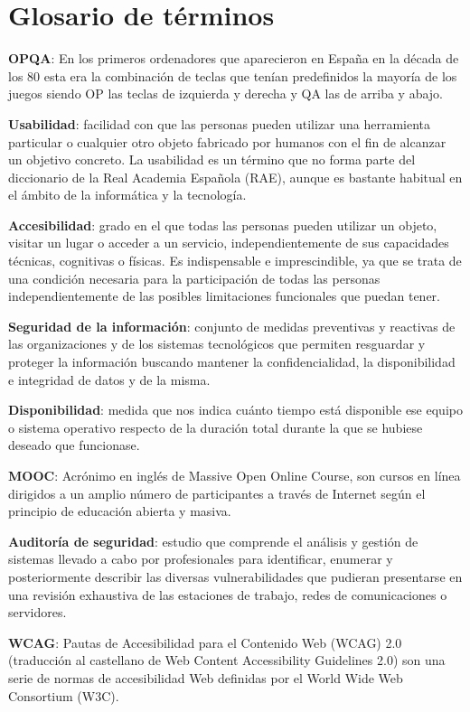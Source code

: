 \chapter{Glosario de términos}


\textbf{OPQA}: En los primeros ordenadores que aparecieron en España en la década de los 80 esta era la combinación de teclas que tenían predefinidos la mayoría de los juegos siendo OP las teclas de izquierda y derecha y QA las de arriba y abajo.
\bigskip

\textbf{Usabilidad}: facilidad con que las personas pueden utilizar una herramienta particular o cualquier otro objeto fabricado por humanos con el fin de alcanzar un objetivo concreto. La usabilidad es un término que no forma parte del diccionario de la Real Academia Española (RAE), aunque es bastante habitual en el ámbito de la informática y la tecnología.
\bigskip

\textbf{Accesibilidad}: grado en el que todas las personas pueden utilizar un objeto, visitar un lugar o acceder a un servicio, independientemente de sus capacidades técnicas, cognitivas o físicas. Es indispensable e imprescindible, ya que se trata de una condición necesaria para la participación de todas las personas independientemente de las posibles limitaciones funcionales que puedan tener.
\bigskip

\textbf{Seguridad de la información}: conjunto de medidas preventivas y reactivas de las organizaciones y de los sistemas tecnológicos que permiten resguardar y proteger la información buscando mantener la confidencialidad, la disponibilidad e integridad de datos y de la misma.
\bigskip

\textbf{Disponibilidad}: medida que nos indica cuánto tiempo está disponible ese equipo o sistema operativo respecto de la duración total durante la que se hubiese deseado que funcionase.
\bigskip


\textbf{MOOC}: Acrónimo en inglés de Massive Open Online Course, son cursos en línea dirigidos a un amplio número de participantes a través de Internet según el principio de educación abierta y masiva.
\bigskip

 \textbf{Auditoría de seguridad}: estudio que comprende el análisis y gestión de sistemas llevado a cabo por profesionales para identificar, enumerar y posteriormente describir las diversas vulnerabilidades que pudieran presentarse en una revisión exhaustiva de las estaciones de trabajo, redes de comunicaciones o servidores.
\bigskip

 \textbf{WCAG}: Pautas de Accesibilidad para el Contenido Web (WCAG) 2.0 (traducción al castellano de Web Content Accessibility Guidelines 2.0) son una serie de normas de accesibilidad Web definidas por el World Wide Web Consortium (W3C).
\bigskip




